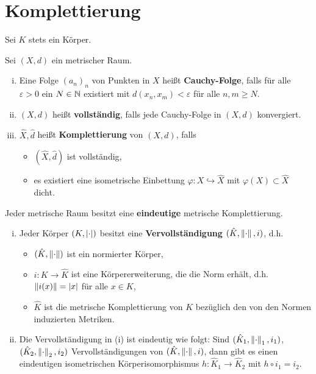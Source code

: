 \section{Komplettierung}

Sei $K$ stets ein Körper.

\begin{defi}
Sei $(X,d)$ ein metrischer Raum.
\begin{enumerate}[(i)]
\item Eine Folge $(a_n)_n$ von Punkten in $X$ heißt \textbf{Cauchy-Folge}, falls für alle $\varepsilon >0 $ ein $N\in\mathbb{N}$ existiert mit $d(x_n,x_m)< \varepsilon$ für alle $n,m \geq N$.
\item $(X,d)$ heißt \textbf{vollständig}, falls jede Cauchy-Folge in $(X,d)$ konvergiert.
\item $\hat{X}, \hat{d}$ heißt \textbf{Komplettierung} von $(X,d)$, falls
	\begin{itemize}
	\item $(\hat{X},\hat{d})$ ist vollständig,
	\item es existiert eine isometrische Einbettung $\varphi \colon X \hookrightarrow \hat{X}$ mit
	$\varphi(X) \subset \hat{X}$ dicht.
	\end{itemize}
\end{enumerate}
\end{defi}

\begin{Fakt}
Jeder metrische Raum besitzt eine \textbf{eindeutige} metrische Komplettierung.
\end{Fakt}


\begin{Satz}
\begin{enumerate}[(i)]
\item Jeder Körper $(K,\left|{\cdot}\right|)$ besitzt eine \textbf{Vervollständigung} $(\hat{K}, \left\|{\cdot}\right\|, i)$, d.h.
	\begin{itemize}
	\item $(\hat{K}, \left\|{\cdot}\right\|)$ ist ein normierter Körper,
	\item $i \colon K \to \hat{K}$ ist eine Körpererweiterung, die die Norm erhält, d.h.
	$\left\|{i(x)}\right\| = \left|{x}\right|$ für alle $x \in K$,
	\item $\hat{K}$ ist die metrische Komplettierung von $K$ bezüglich den von den Normen induzierten Metriken.
	\end{itemize}
\item Die Vervollständigung in (i) ist eindeutig wie folgt:
		Sind $(\hat{K}_1, \left\|{\cdot}\right\|_1, i_1)$, $(\hat{K}_2, \left\|{\cdot}\right\|_2, i_2)$ Vervollständigungen von $(\hat{K}, \left\|{\cdot}\right\|, i)$, dann gibt es einen eindeutigen isometrischen Körperisomorphismus $h \colon \hat{K}_1 \to \hat{K}_2$ mit $h\circ i_1 = i_2$.
\end{enumerate}
\end{Satz}


